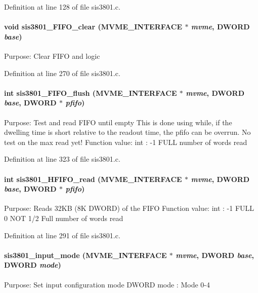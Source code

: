 Definition at line 128 of file sis3801.c.
\paragraph[{sis3801\_\-FIFO\_\-clear}]{\setlength{\rightskip}{0pt plus 5cm}void sis3801\_\-FIFO\_\-clear ({\bf MVME\_\-INTERFACE} $\ast$ {\em mvme}, \/  {\bf DWORD} {\em base})}\hfill\label{sis3801_8c_aee9b0f8f5e70dcaab5443c4e2e533dad}
Purpose: Clear FIFO and logic 

Definition at line 270 of file sis3801.c.
\paragraph[{sis3801\_\-FIFO\_\-flush}]{\setlength{\rightskip}{0pt plus 5cm}int sis3801\_\-FIFO\_\-flush ({\bf MVME\_\-INTERFACE} $\ast$ {\em mvme}, \/  {\bf DWORD} {\em base}, \/  {\bf DWORD} $\ast$ {\em pfifo})}\hfill\label{sis3801_8c_abcf16fa0ffafda6f1fa5c219d31f7630}
Purpose: Test and read FIFO until empty This is done using while, if the dwelling time is short relative to the readout time, the pfifo can be overrun. No test on the max read yet! Function value: int : -\/1 FULL number of words read 

Definition at line 323 of file sis3801.c.
\paragraph[{sis3801\_\-HFIFO\_\-read}]{\setlength{\rightskip}{0pt plus 5cm}int sis3801\_\-HFIFO\_\-read ({\bf MVME\_\-INTERFACE} $\ast$ {\em mvme}, \/  {\bf DWORD} {\em base}, \/  {\bf DWORD} $\ast$ {\em pfifo})}\hfill\label{sis3801_8c_a1b473f4e9a07343d020798be54dcf54b}
Purpose: Reads 32KB (8K DWORD) of the FIFO Function value: int : -\/1 FULL 0 NOT 1/2 Full number of words read 

Definition at line 291 of file sis3801.c.
\paragraph[{sis3801\_\-input\_\-mode}]{ sis3801\_\-input\_\-mode ({\bf MVME\_\-INTERFACE} $\ast$ {\em mvme}, \/  {\bf DWORD} {\em base}, \/  {\bf DWORD} {\em mode})}\hfill\label{sis3801_8c_a80d78bb85d728329fb2f5c32bca9b258}
Purpose: Set input configuration mode DWORD mode : Mode 0-\/4 

